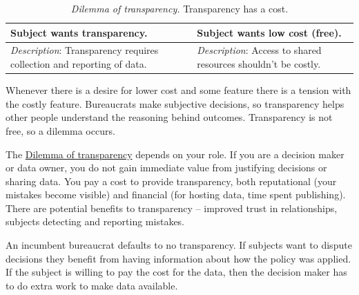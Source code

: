 \begin{center}
\begin{table}[H] %
\begin{tabular}{ | m{\dilemmatablewidth}| m{\dilemmatablewidth} | } 
  \hline
  \textbf{Subject wants transparency.} &
  \textbf{Subject wants low cost (free).} \\
  \hline
  \textit{Description}: Transparency requires collection and reporting of data. & 
  \textit{Description}: Access to shared resources shouldn't be costly. \\
  \hline
\end{tabular}
\caption{\textit{Dilemma of transparency.}
Transparency has a cost.
}
\label{table:dilemma-transparency}
\end{table}
\end{center}

Whenever there is a desire for lower cost and some feature there is a tension with the costly feature. Bureaucrats make subjective decisions, so transparency helps other people understand the reasoning behind outcomes. Transparency is not free, so a dilemma occurs. 


The \hyperref[table:dilemma-transparency]{Dilemma of transparency} depends on your role. If you are a decision maker or data owner, you do not gain immediate value from justifying decisions or sharing data. You pay a cost to provide transparency, both reputational (your mistakes become visible) and financial (for hosting data, time spent publishing). There are potential benefits to transparency -- improved trust in relationships, subjects detecting and reporting mistakes. 

An incumbent bureaucrat defaults to no transparency. If subjects want to dispute decisions they benefit from having information about how the policy was applied. If the subject is willing to pay the cost for the data, then the decision maker has to do extra work to make data available.


